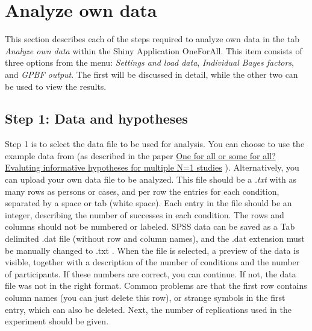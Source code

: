 \documentclass[11pt, fullpage, a4paper]{article}
\begin{document}
	\section{Analyze own data}
	\label{sec:2}
	This section describes each of the steps required to analyze own data in the tab \textit{Analyze own data} within the Shiny Application OneForAll. This item consists of three options from the menu: \textit{Settings and load data}, \textit{Individual Bayes factors}, and \textit{GPBF output}. The first will be discussed in detail, while the other two can be used to view the results.
	\subsection{Step 1: Data and hypotheses}
	Step 1 is to select the data file to be used for analysis.
	You can choose to use the example data from \citeauthor{zedelius11} \citeyear{zedelius11} (as described in the paper \href{https://doi.org/10.3758/s13428-017-0992-5}{One for all or some for all? Evaluting informative hypotheses for multiple N=1 studies} \cite{klaassenBSES}).
	Alternatively, you can upload your own data file to be analyzed.
	This file should be a \textit{.txt} with as many rows as persons or cases, and per row the entries for each condition, separated by a space or tab (white space).
	Each entry in the file should be an integer, describing the number of successes in each condition.
	The rows and columns should not be numbered or labeled. 
	SPSS data can be saved as a Tab delimited .dat file (without row and column names), and the .dat extension must be manually changed to .txt .
	When the file is selected, a preview of the data is visible, together with a description of the number of conditions and the number of participants. 
	If these numbers are correct, you can continue.
	If not, the data file was not in the right format. 
	Common problems are that the first row contains column names (you can just delete this row), or strange symbols in the first entry, which can also be deleted.
	Next, the number of replications used in the experiment should be given.
\end{document}
